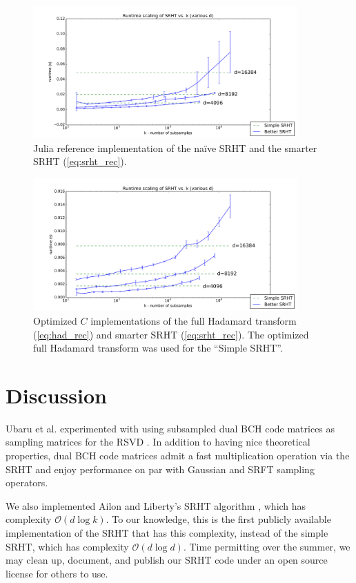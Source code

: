 \documentclass[12pt]{article}
\begin{document}
\begin{figure}[ht!]
   \centering
   \includegraphics[width=0.9\textwidth]{figures/srht_julia_ref_k_scaling.pdf}
   \caption{Julia reference implementation of the na\"ive SRHT and the smarter SRHT (\ref{eq:srht_rec}).}
   \label{fig:srht_julia_ref}
\end{figure}

\begin{figure}[ht!]
   \centering
   \includegraphics[width=0.9\textwidth]{figures/srht_C_k_scaling.pdf}
   \caption{Optimized $C$ implementations of the full Hadamard transform (\ref{eq:had_rec}) and smarter SRHT (\ref{eq:srht_rec}).  The optimized full Hadamard transform was used for the ``Simple SRHT''.}
   \label{fig:srht_C}
\end{figure}


\section{Discussion}
Ubaru et al. experimented with using subsampled dual BCH code matrices as sampling matrices for the RSVD \cite{ubaru2015low}.  In addition to having nice theoretical properties, dual BCH code matrices admit a fast multiplication operation via the SRHT and enjoy performance on par with Gaussian and SRFT sampling operators.

We also implemented Ailon and Liberty's SRHT algorithm \cite{ailon2009fast}, which has complexity $\mathcal{O}(d\log k)$.  To our knowledge, this is the first publicly available implementation of the SRHT that has this complexity, instead of the simple SRHT, which has complexity $\mathcal{O}(d\log d)$.  Time permitting over the summer, we may clean up, document, and publish our SRHT code under an open source license for others to use.



 
\end{document}
